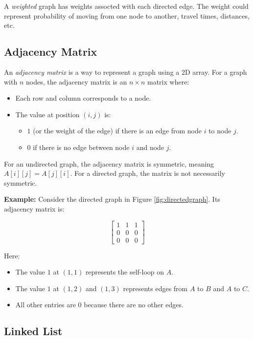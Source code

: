 A \emph{weighted} graph has weights assocted with each directed edge. The weight
could represent probability of moving from one node to another, travel times, distances,
etc.

\subsection{Adjacency Matrix}

An \emph{adjacency matrix} is a way to represent a graph using a
2D array. For a graph with $n$ nodes, the adjacency matrix is an
$n \times n$ matrix where:

\begin{itemize}
    \item Each row and column corresponds to a node.
    \item The value at position $(i, j)$ is:
          \begin{itemize}
              \item $1$ (or the weight of the edge) if there
                    is an edge from node $i$ to node $j$.
              \item $0$ if there is no edge between node $i$ and node $j$.
          \end{itemize}
\end{itemize}

For an undirected graph, the adjacency matrix is symmetric,
meaning $A[i][j] = A[j][i]$. For a directed graph, the matrix
is not necessarily symmetric.

\textbf{Example:} Consider the directed graph in Figure
\ref{fig:directedgraph}. Its adjacency matrix is:

\[
    \begin{bmatrix}
        1 & 1 & 1 \\
        0 & 0 & 0 \\
        0 & 0 & 0
    \end{bmatrix}
\]

Here:
\begin{itemize}
    \item The value $1$ at $(1,1)$ represents the self-loop on $A$.
    \item The value $1$ at $(1,2)$ and $(1,3)$ represents edges from $A$ to $B$ and $A$ to $C$.
    \item All other entries are $0$ because there are no other edges.
\end{itemize}

\subsection{Linked List}

